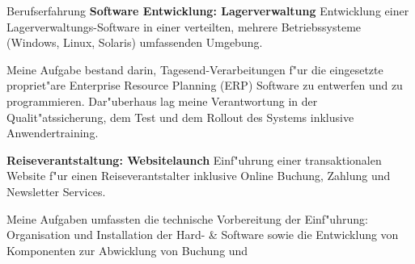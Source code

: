 \begin{rubric}{Berufserfahrung}
\entry*[01/2001 - 10/2001] \textbf{Software Entwicklung: Lagerverwaltung}\newline
{} 
Entwicklung einer Lagerverwaltungs-Software in einer verteilten, mehrere Betriebs\-systeme (Windows, Linux, Solaris) umfassenden Umgebung.\axelvspace

Meine Aufgabe bestand darin, Tagesend-Verarbeitungen f"ur die eingesetzte propriet"are Enterprise Resource Planning (ERP) Software zu entwerfen und zu programmieren. Dar"uberhaus lag meine Verantwortung in der Qualit"atssicherung, dem Test und dem Rollout des Systems inklusive Anwendertraining.



\entry*[06/1999 - 10/1999] \textbf{Reiseverantstaltung: Websitelaunch}\newline
{} 
Einf"uhrung einer transaktionalen Website f"ur einen Reiseverantstalter inklusive Online Buchung, Zahlung und Newsletter Services.\axelvspace

Meine Aufgaben umfassten die technische Vorbereitung der Einf"uhrung: Organisation und Installation der Hard- \& Software sowie die Entwicklung von Komponenten zur Abwicklung von Buchung und %




\end{rubric}
